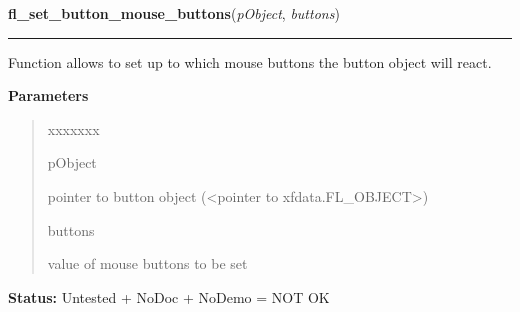     \vspace{0.5ex}

\hspace{.8\funcindent}\begin{boxedminipage}{\funcwidth}

    \raggedright \textbf{fl\_set\_button\_mouse\_buttons}(\textit{pObject}, \textit{buttons})

    \vspace{-1.5ex}

    \rule{\textwidth}{0.5\fboxrule}
\setlength{\parskip}{2ex}
    Function allows to set up to which mouse buttons the button object will
    react.

\setlength{\parskip}{1ex}
      \textbf{Parameters}
      \vspace{-1ex}

      \begin{quote}
        \begin{Ventry}{xxxxxxx}

          \item[pObject]

          pointer to button object ({\textless}pointer to 
          xfdata.FL\_OBJECT{\textgreater})

          \item[buttons]

          value of mouse buttons to be set

        \end{Ventry}

      \end{quote}

\textbf{Status:} Untested + NoDoc + NoDemo = NOT OK



    \end{boxedminipage}

    \label{xformslib:library:fl_get_button_mouse_buttons}

    \vspace{0.5ex}

